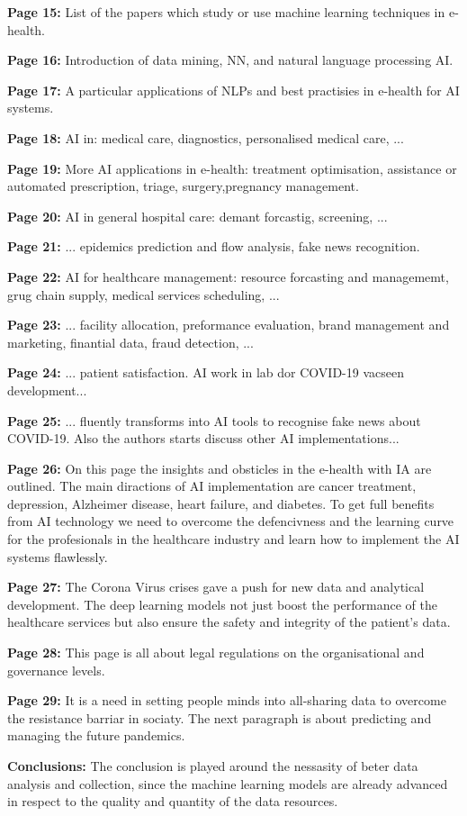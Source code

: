     \textbf{Page 15:}
    List of the papers which study or use machine learning techniques in e-health.
    
    \textbf{Page 16:}
    Introduction of data mining, NN, and natural language processing AI.
    
    \textbf{Page 17:}
    A particular applications of NLPs and best practisies in e-health for AI systems.
    
    \textbf{Page 18:}
    AI in: medical care, diagnostics, personalised medical care, ...
    
    \textbf{Page 19:}
    More AI applications in e-health: treatment optimisation, assistance or automated prescription, triage, surgery,pregnancy management.
    
    \textbf{Page 20:}
    AI in general hospital care: demant forcastig, screening, ...
    
    \textbf{Page 21:}
    ... epidemics prediction and flow analysis, fake news recognition.
    
    \textbf{Page 22:}
    AI for healthcare management: resource forcasting and managememt, grug chain supply, medical services scheduling, ...
    
    \textbf{Page 23:}
    ... facility allocation, preformance evaluation, brand management and marketing, finantial data, fraud detection, ...
    
    \textbf{Page 24:}
    ... patient satisfaction. AI work in lab dor COVID-19 vacseen development...
    
    \textbf{Page 25:}
    ... fluently transforms into AI tools to recognise fake news about COVID-19. Also the authors starts discuss other AI implementations...
    
    \textbf{Page 26:}
    On this page the insights and obsticles in the e-health with IA are outlined. The main diractions of AI implementation are cancer treatment, depression, Alzheimer disease, heart failure, and diabetes. To get full benefits from AI technology we need to overcome the defencivness and the learning curve for the profesionals in the healthcare industry and learn how to implement the AI systems flawlessly.

    \textbf{Page 27:}
    The Corona Virus crises gave a push for new data and analytical development.
    The deep learning models not just boost the performance of the healthcare services but also ensure the safety and integrity of the patient's data.
    
    \textbf{Page 28:}
    This page is all about legal regulations on the organisational and governance levels.

    \textbf{Page 29:}
    It is a need in setting people minds into all-sharing data to overcome the resistance barriar in sociaty. The next paragraph is about predicting and managing the future pandemics.
    
    \textbf{Conclusions:}
    The conclusion is played around the nessasity of beter data analysis and collection, since the machine learning models are already advanced in respect to the quality and quantity of the data resources.
